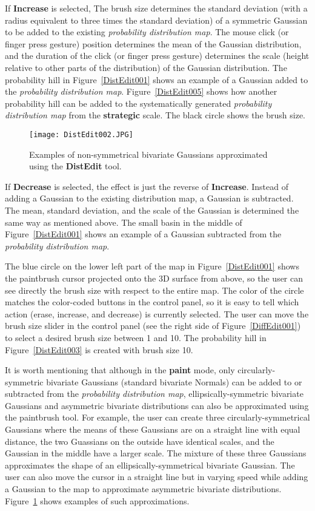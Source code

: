 If \textbf{Increase} is selected, The brush size determines the standard deviation (with a radius equivalent to three times the standard deviation) of a symmetric Gaussian to be added to the existing \textit{probability distribution map}. The mouse click (or finger press gesture) position determines the mean of the Gaussian distribution, and the duration of the click (or finger press gesture) determines the scale (height relative to other parts of the distribution) of the Gaussian distribution. The probability hill in Figure~\ref{DistEdit001} shows an example of a Gaussian added to the \textit{probability distribution map}. Figure~\ref{DistEdit005} shows how another probability hill can be added to the systematically generated \textit{probability distribution map} from the \textbf{strategic} scale. The black circle shows the brush size.

\begin{figure}
\centering
\texttt{[image: DistEdit002.JPG]}
\caption{Examples of non-symmetrical bivariate Gaussians approximated using the \textbf{DistEdit} tool.}
\label{DistEdit002}
\end{figure}

If \textbf{Decrease} is selected, the effect is just the reverse of \textbf{Increase}. Instead of adding a Gaussian to the existing distribution map, a Gaussian is subtracted. The mean, standard deviation, and the scale of the Gaussian is determined the same way as mentioned above. The small basin in the middle of Figure~\ref{DistEdit001} shows an example of a Gaussian subtracted from the \textit{probability distribution map}.

The blue circle on the lower left part of the map in Figure~\ref{DistEdit001} shows the paintbrush cursor projected onto the 3D surface from above, so the user can see directly the brush size with respect to the entire map. The color of the circle matches the color-coded buttons in the control panel, so it is easy to tell which action (erase, increase, and decrease) is currently selected. The user can move the brush size slider in the control panel (see the right side of Figure~\ref{DiffEdit001}) to select a desired brush size between 1 and 10. The probability hill in Figure~\ref{DistEdit003} is created with brush size 10.

It is worth mentioning that although in the \textbf{paint} mode, only circularly-symmetric bivariate Gaussians (standard bivariate Normals) can be added to or subtracted from the \textit{probability distribution map}, ellipsically-symmetric bivariate Gaussians and asymmetric bivariate distributions can also be approximated using the paintbrush tool. For example, the user can create three circularly-symmetrical Gaussians where the means of these Gaussians are on a straight line with equal distance, the two Guassians on the outside have identical scales, and the Gaussian in the middle have a larger scale. The mixture of these three Gaussians approximates the shape of an ellipsically-symmetrical bivariate Gaussian. The user can also move the cursor in a straight line but in varying speed while adding a Gaussian to the map to approximate asymmetric bivariate distributions. Figure~\ref{DistEdit002} shows examples of such approximations.

